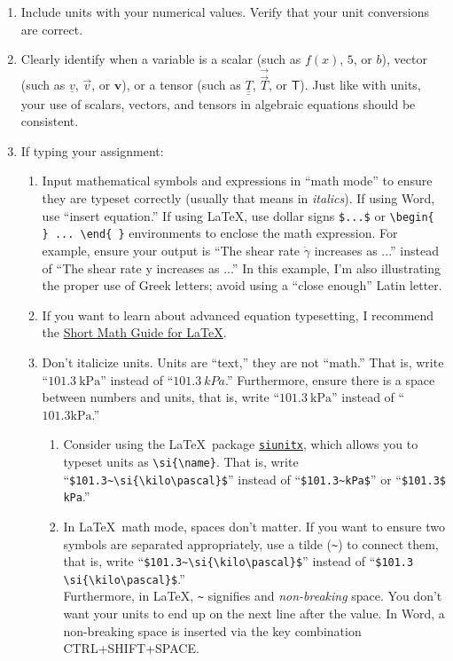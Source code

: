 \documentclass[11pt]{article}
\begin{document}
\begin{enumerate}
	\item Include units with your numerical values. Verify that your unit conversions are correct.

	\item Clearly identify when a variable is a scalar (such as $f(x)$, $5$, or $b$), vector (such as $\underline{v}$, $\vec{v}$, or $\bm{v}$), or a tensor (such as $\underline{\underline{T}}$, $\vec{\vec{T}}$, or $\bm{\mathsf{T}}$). Just like with units, your use of scalars, vectors, and tensors in algebraic equations should be consistent.

	\item If typing your assignment:
	\begin{enumerate}
		\item Input mathematical symbols and expressions in ``math mode'' to ensure they are typeset correctly (usually that means in \textit{italics}). If using Word, use ``insert equation.'' If using \LaTeX, use dollar signs \verb+$...$+ or \verb+\begin{ } ... \end{ }+ environments to enclose the math expression. For example, ensure your output is ``The shear rate $\dot{\gamma}$ increases as ...'' instead of ``The shear rate y increases as ...'' In this example, I'm also illustrating the proper use of Greek letters; avoid using a ``close enough'' Latin letter. \Smiley

		\item If you want to learn about advanced equation typesetting, I recommend the \href{https://ctan.org/pkg/short-math-guide}{Short Math Guide for \LaTeX}.

		\item Don't italicize units. Units are ``text,'' they are not ``math.'' That is, write ``$101.3~\si{\kilo\pascal}$'' instead of ``$101.3~kPa$.'' Furthermore, ensure there is a space between numbers and units, that is, write ``$101.3~\si{\kilo\pascal}$'' instead of ``$101.3\si{\kilo\pascal}$.''

		\begin{enumerate}
			\item[\faLightbulb] Consider using the \LaTeX\ package \href{https://ctan.org/pkg/siunitx}{\texttt{siunitx}}, which allows you to typeset units as \verb+\si{\name}+. That is, write ``\verb+$101.3~\si{\kilo\pascal}$+'' instead of ``\verb+$101.3~kPa$+'' or ``\verb+$101.3$ kPa+.''

			\item[\faLightbulb] In \LaTeX\ math mode, spaces don't matter. If you want to ensure two symbols are separated appropriately, use a tilde (\verb+~+) to connect them, that is, write ``\verb+$101.3~\si{\kilo\pascal}$+'' instead of  ``\verb+$101.3 \si{\kilo\pascal}$+.'' \\
			Furthermore, in \LaTeX, \verb+~+ signifies and \emph{non-breaking} space. You don't want your units to end up on the next line after the value. In Word, a non-breaking space is inserted via the key combination CTRL+SHIFT+SPACE.


\end{enumerate}
\end{enumerate}
\end{enumerate}
\end{document}
